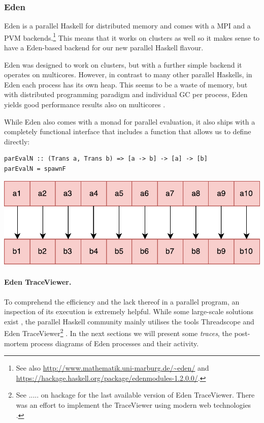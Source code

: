 \subsubsection{Eden}
Eden \cite{eden,Loogen2012} is a parallel Haskell for distributed memory and comes with a MPI and a PVM backends.\footnote{See also \url{http://www.mathematik.uni-marburg.de/~eden/} and \url{https://hackage.haskell.org/package/edenmodules-1.2.0.0/}.} This means that it works on clusters as well so it makes sense to have a Eden-based backend for our new parallel Haskell flavour.

Eden was designed to work on clusters, but with a further simple backend it operates on multicores. However, in contrast to many other parallel Haskells, in Eden each process has its own heap. This seems to be a waste of memory, but with distributed programming paradigm and individual GC per process, Eden yields good performance results also on multicores \cite{arcs-dc,aswad2009low}.

While Eden also comes with a monad  for parallel evaluation, it also ships with a completely functional interface that includes
a  function that
allows us to define  directly:

\begin{lstlisting}[frame=htrbl]
parEvalN :: (Trans a, Trans b) => [a -> b] -> [a] -> [b]
parEvalN = spawnF 
\end{lstlisting}
\begin{center}
	\includegraphics[scale=0.5]{images/parEvalNEden}
\end{center}

\paragraph{Eden TraceViewer.}
To comprehend the efficiency and the lack thereof in a parallel program, an inspection of its execution is extremely helpful. While some large-scale solutions exist \cite{Geimer2010}, the parallel Haskell community mainly utilises the tools Threadscope \cite{Wheeler2009} and Eden TraceViewer\footnote{See ..... on hackage for the last available version of Eden TraceViewer. There was an effort to implement the TraceViewer using modern web technologies \cite{traceviewer-web}.} \cite{Berthold2007a}. In the next sections we will present some \emph{traces}, the post-mortem process diagrams of Eden processes and their activity.

